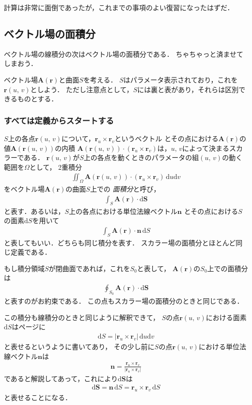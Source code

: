 計算は非常に面倒であったが，これまでの事項のよい復習になったはずだ．

\subsection{ベクトル場の面積分}
ベクトル場の線積分の次はベクトル場の面積分である．
ちゃちゃっと済ませてしまおう．

ベクトル場$\bm{A}(\bm{r})$と曲面$S$を考える．
$S$はパラメータ表示されており，これを$\bm{r}(u, \, v)$としよう．
ただし注意点として，$S$には裏と表があり，それらは区別できるものとする．
\subsubsection{すべては定義からスタートする}
$S$上の各点$\bm{r}(u, \, v)$について，$\bm{r}_u \times \bm{r}_v$というベクトル
とその点における$\bm{A}(\bm{r})$の値$\bm{A}(\bm{r}(u, \, v))$の内積
$\bm{A}(\bm{r}(u, \, v)) \cdot (\bm{r}_u \times \bm{r}_v ) $は，$u, \, v$によって決まるスカラーである．
$\bm{r}(u, \, v)$が$S$上の各点を動くときのパラメータの組$(u, \, v)$の動く範囲を$\Omega$として，
2重積分
\begin{align*}
\iint_{\Omega} \bm{A}( \bm{r} (u, \, v) ) \cdot 
( \bm{r}_u \times \bm{r}_v ) \, \mathrm{d}u\mathrm{d}v
\end{align*}
をベクトル場$\bm{A}(\bm{r})$の曲面$S$上での
\emph{面積分}と呼び，
\begin{align*}
\int_S \bm{A}(\bm{r}) \cdot \mathrm{d} \bm{S} 
\end{align*}
と表す．あるいは，$S$上の各点における単位法線ベクトル$\bm{n}$
とその点における$S$の面素$\mathrm{d}S$を用いて
\begin{align*}
\int_S \bm{A}(\bm{r}) \cdot \bm{n} \, \mathrm{d} S 
\end{align*}
と表してもいい．どちらも同じ積分を表す．
スカラー場の面積分とほとんど同じ定義である．

もし積分領域$S$が閉曲面であれば，これを$S_0$と表して，
$\bm{A}(\bm{r})$の$S_0$上での面積分は
\begin{align*}
\oint_{S_0} \bm{A}(\bm{r}) \cdot \mathrm{d}\bm{S}
\end{align*}
と表すのがお約束である．
この点もスカラー場の面積分のときと同じである．

この積分も線積分のときと同じように解釈できて，
$S$の点$\bm{r}(u, \, v)$における面素$\mathrm{d}S$は\pageref{eq:menso}ページに
\begin{align*}
\mathrm{d} S = \lvert \bm{r}_u \times \bm{r}_v \rvert \, \mathrm{d}u \mathrm{d}v
\end{align*}
と表せるというように書いてあり，
その少し前に$S$の点$\bm{r}(u, \, v)$における単位法線ベクトル$\bm{n}$は
\begin{align*}
\bm{n} = \frac{ \bm{r}_u \times \bm{r}_v }{ \lvert \bm{r}_u \times \bm{r}_v \rvert}
\end{align*}
であると解説してあって，これにより$\mathrm{d}\bm{S}$は
\begin{align}
\mathrm{d} \bm{S} = \bm{n} \, \mathrm{d} S 
= \bm{r}_u \times \bm{r}_v \, \mathrm{d} S
\label{eq:mensoparameta}
\end{align}
と表せることになる．

